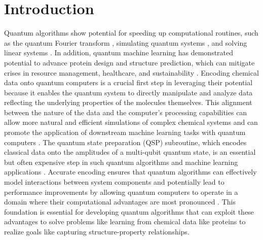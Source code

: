 \section{Introduction}

Quantum algorithms show potential for speeding up computational routines, such
as the quantum Fourier transform \cite{shor1994algorithms}, simulating quantum systems \cite{lloyd1996universal, berry2015simulating, berry2015hamiltonian,  low2017optimal, low2019hamiltonian}, and solving linear systems
\cite{PhysRevLett.103.150502, wossnig2018quantum}. In
addition, quantum machine learning has demonstrated potential to advance
protein design and structure prediction, which can mitigate crises in resource
management, healthcare, and sustainability \cite{outeiral2021prospects,batra2021quantum,ajagekar2022new,andersson2022quantum}. Encoding chemical data onto quantum computers is a crucial first step in leveraging their potential because it enables the quantum system to directly manipulate and analyze data reflecting the underlying properties of the molecules themselves. This alignment between the nature of the data and the computer's processing capabilities can allow more natural and efficient simulations of complex chemical systems and can promote the application of downstream machine learning tasks with quantum computers \cite{doga2024perspective}. The quantum state preparation (QSP)
subroutine, which encodes classical data onto the amplitudes of a multi-qubit
quantum state, is an essential but often expensive step in such quantum algorithms and machine learning applications \cite{aaronson2015read}. 
Accurate encoding ensures that quantum algorithms can effectively model interactions between system components and potentially lead to performance improvements by allowing quantum computers to operate in a domain where their computational advantages are most pronounced \cite{pal2024quantum}. This foundation is essential for developing quantum algorithms that can exploit these advantages to solve problems like learning from chemical data like proteins to realize goals like capturing structure-property relationships. 

